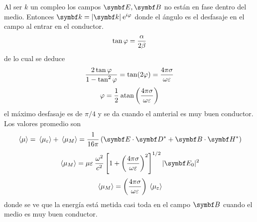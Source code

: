 \documentclass[10pt,oneside]{CBFT_book}
\begin{document}
Al ser $k$ un compleo los campos $\vb{E}, \vb{B}$ no están en fase dentro del medio. Entonces
$ \vb{k} = |\vb{k}| \euler^{i \vp} $ donde el ángulo es el desfasaje en el campo al entrar en el
conductor.
\[
	\tan \varphi = \frac{\alpha}{2\beta}
\]
de lo cual se deduce
\[
	\frac{2 \tan \varphi }{1 - \tan^2 \varphi} = \tan (2\varphi) = 
	\frac{4 \pi \sigma }{\omega \varepsilon }
\]
\[
	\varphi = \frac{1}{2} \:\mathrm{ atan }\left( \frac{ 4\pi\sigma }{ \omega\varepsilon } \right)
\]
el máximo desfasaje es de $ \pi /4 $ y se da cuando el amterial es muy buen conductor.
Los valores promedio son
\[
	\vm{\mu} = \vm{\mu_\varepsilon} + \vm{\mu_M} = \frac{1}{16\pi}
	\left( \vb{E}\cdot\vb{D}^* + \vb{B}\cdot\vb{H}^* \right)
\]
\[
	\vm{\mu_M} = \mu\varepsilon \:\frac{\omega^2}{c^2} 
	\left[ 1 + \Frac{4\pi\sigma}{\omega\varepsilon}^2 \right]^{1/2} |\vb{E}_0|^2
\]
\[
	\:\langle \mu_M \rangle = \left( \frac{ 4\pi\sigma }{ \omega\varepsilon } \right) \:\langle \mu_\varepsilon \rangle
\]
donde se ve que la energía está metida casi toda en el campo $\vb{B}$ cuando el medio es muy buen
conductor.
\end{document}
